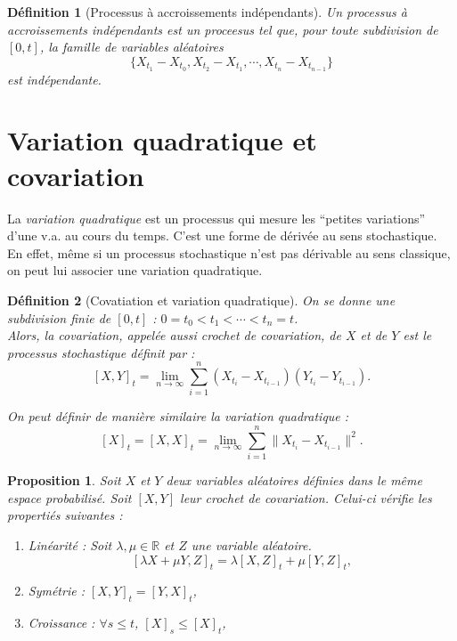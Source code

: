 \documentclass[openany]{book}
\newcommand{\R}{\mathbb{R}}
\newcommand{\1}{\mathbbm{1}}
\theoremstyle{thmfont}
\theoremstyle{deffont}
\newtheorem{definition}[definition]{Définition}
\theoremstyle{thmfont}
\newtheorem{prop}[prop]{Proposition}
\theoremstyle{deffont}
\begin{document}
\begin{definition}[Processus à accroissements indépendants]
  \label{def:pr_accr_indep} Un processus à \textit{accroissements indépendants} est un proceesus tel que, pour toute subdivision de $[0,t]$, la famille de variables aléatoires
    $$\{X_{t_1} - X_{t_0}, X_{t_2} - X_{t_1}, \cdots ,X_{t_n} - X_{t_{n-1}}\}$$
    est indépendante.
  \end{definition}
  
\section{Variation quadratique et covariation}

La \textit{variation quadratique} est un processus qui mesure les ``petites variations'' d'une v.a. au cours du temps. C'est une forme de dérivée au sens stochastique. En effet, même si un processus stochastique n'est pas dérivable au sens classique, on peut lui associer une variation quadratique. 

\begin{definition}[Covatiation et variation quadratique] On se donne une subdivision finie de $[0,t]$ :  $0 = t_0 < t_1 < \cdots < t_n = t$.\\
  Alors, la \textit{covariation}, appelée aussi \textit{crochet de covariation}, de $X$ et de $Y$ est le processus stochastique définit par :
  $$[X,Y]_t = \lim_{n\to \infty} \sum_{i = 1}^n(X_{t_i} - X_{t_{i-1}})(Y_{t_i} - Y_{t_{i-1}}).$$

 On peut définir de manière similaire la \textit{variation quadratique} :
 $$[X]_t = [X,X]_t = \lim_{n\to \infty} \sum_{i = 1}^n\|X_{t_i} - X_{t_{i-1}}\|^2.$$
\label{def:crochet}
\end{definition}

\begin{prop} Soit $X$ et $Y$ deux variables aléatoires définies dans le même espace probabilisé. Soit $[X,Y]$ leur crochet de covariation. Celui-ci vérifie les propertiés suivantes : 
  \begin{enumerate}
  \item Linéarité : Soit $\lambda, \mu \in \R$ et $Z$ une variable aléatoire. $$[\lambda X + \mu Y, Z]_t = \lambda[X,Z]_t + \mu[Y,Z]_t,$$
  \item Symétrie : $[X,Y]_t = [Y,X]_t$,
  \item Croissance : $\forall s\leq t$, $[X]_s \leq [X]_t$,
  \end{enumerate}
\end{prop}
\end{document}
